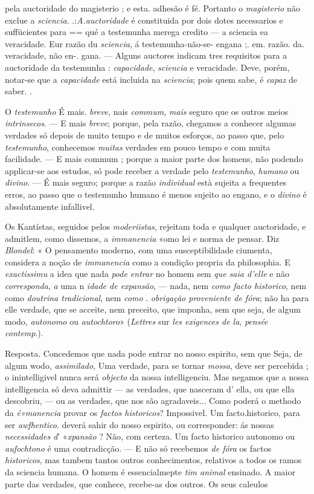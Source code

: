 pela auctoridade do magisterio ; e esta. adhesão é fé. Portanto o \emph{magisterio} não exclue a \emph{sciencia}. .:\emph{A.auctoridade} é constituida por dois dotes necessarios e suffücientes para == qué a testemunha merega credito --- a sciencia ea veracidade. Eur razão du \emph{sciencia}, á testemunha-não-se- engana ;. em. razão. da. veracidade, não en-. gana. --- Alguns auctores indicam tres requisitos para a auctoridade da testemunha : \emph{capacidade}, \emph{sciencia} e veracidade. Deve, porém, notar-se que a \emph{capacidade} está incluida na \emph{sciencia}; pois quem sabe, é \emph{capaz} de saber. .\par O \emph{testemunho} É mais. \emph{breve}, nais \emph{commum}, \emph{mais} seguro que os outros meios \emph{intrinsecos}. --- E mais \emph{breve}; porque, pela razão, chegamos a conhecer algumas verdades só depois de muito tempo e de muitos esforços, ao passo que, pelo \emph{testemunho}, conhecemos \emph{muitas} verdades em pouco tempo e com muita facilidade. --- E mais commum ; porque a maior parte dos homens, não podendo applicar-se aos estudos, só pode receber a verdade pelo \emph{testemunho}, \emph{humano} ou \emph{divino}. --- É mais seguro; porque a razão \emph{individual} està sujeita a frequentes erros, ao passo que o testemunho humano é menos sujeito ao engano, e o \emph{divino} é absolutamente infallivel.\par Os Kantístas, seguidos pelos \emph{moderiistas}, rejeitam toda e qualquer auctoridade, e admitlem, como dissemos, a \emph{immanencia} «omo lei e norma de pensar. Diz \emph{Blondel}: « O pensamento moderno, com uma susceptibilidade ciumenta, considera a noção de \emph{immanencia} como a condição propria da philosophia. E \emph{exactissimu} a idea que nada \emph{pode entrar} no homem sem \emph{que saia d'elle} e não \emph{corresponda}, \emph{a} uma n \emph{idade de expansão}, --- nada, nem \emph{como facto historico}, nem como \emph{doutrina tradicional}, nem \emph{como} . \emph{obrigação proveniente de fóra}; não ha para elle verdade, que se acceite, nem preceito, que imponha, sem que seja, de algum modo, \emph{autonomo} ou \emph{autochtoro}» (\emph{Lettres} sur \emph{les exigences de la}, \emph{pensée contemp}.).\par Resposta. Concedemos que nada pode entrar no nosso espirito, sem que Seja, de algum wodo, \emph{assimilado}, Uma verdade, para se tornar \emph{mossa}, deve ser percebida ; o inintelligivel nunca será \emph{objecto} da nossa intelligenciu. Mas negamos que a nossa intelligencia só deva admittir --- as verdades, que nasceram d' ella, ou que ella descobriu, --- ou as verdades, que nos são agradaveis... Como poderá o methodo da \emph{é»manencia} provar os \emph{factos historicos}? Impossivel. Um facto.historico, para ser \emph{awfhentico}. deverá sahir do nosso espirito, ou corresponder: ás nossas \emph{necessidades d}' «\emph{xpansão} ? Não, com certeza. Um facto historico autonomo ou \emph{aufochtono} é uma contradicção. --- E não só recebemos \emph{de fóra} os factos \emph{historicos}, mas tambem tantos outros conhecimentos, relativos a todos os ramos da sciencia humana. O homem é essencialmepte \emph{tim animal} ensinado. A maior parte das verdades, que conhece, recebe-as dos outros. Os seus caleulos 